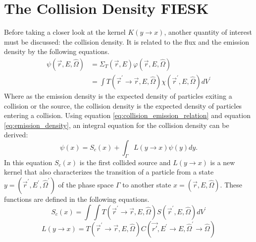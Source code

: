 \section{The Collision Density FIESK}
Before taking a closer look at the kernel $K(y \to x)$, another quantity of 
interest must be discussed: the collision density. It is related to the
flux and the emission density by the following equations.
\begin{align}
  \psi(\vec{r},E,\hat{\Omega}) & = \Sigma_T(\vec{r},E)
  \varphi(\vec{r},E,\hat{\Omega}) \\
  & = \int T(\vec{r}^{'} \to \vec{r},E,\hat{\Omega})
  \chi(\vec{r}^{'},E,\hat{\Omega})dV^{'}
  \label{eq:collision_emission_relation}
\end{align}
Where as the emission density is the expected density of particles exiting a 
collision or the source, the collision density is the expected density of 
particles entering a collision. Using equation 
\ref{eq:collision_emission_relation} and equation \ref{eq:emission_density}, an 
integral equation for the collision density can be derived:
\begin{equation*}
  \psi(x) = S_c(x) + \int_{\Gamma} L(y \to x)\psi(y)dy.
\end{equation*}
In this equation $S_c(x)$ is the first collided source and $L(y \to x)$ is
a new kernel that also characterizes the transition of a particle from a state 
$y = (\vec{r}^{'},E^{'},\hat{\Omega}^{'})$ of the phase space $\Gamma$ to another 
state $x = (\vec{r},E,\hat{\Omega})$. These functions are defined in the 
following equations.
\begin{equation}
  S_c(x) = \int\int T(\vec{r}^{'} \to \vec{r},E,\hat{\Omega})
  S(\vec{r}^{'},E,\hat{\Omega})dV^{'}
\end{equation}
\begin{equation}
  L(y \to x) =
  T(\vec{r}^{'} \to \vec{r},E,\hat{\Omega})
  C(\vec{r'},E^{'} \to E,\hat{\Omega}^{'} \to \hat{\Omega})
\end{equation}


